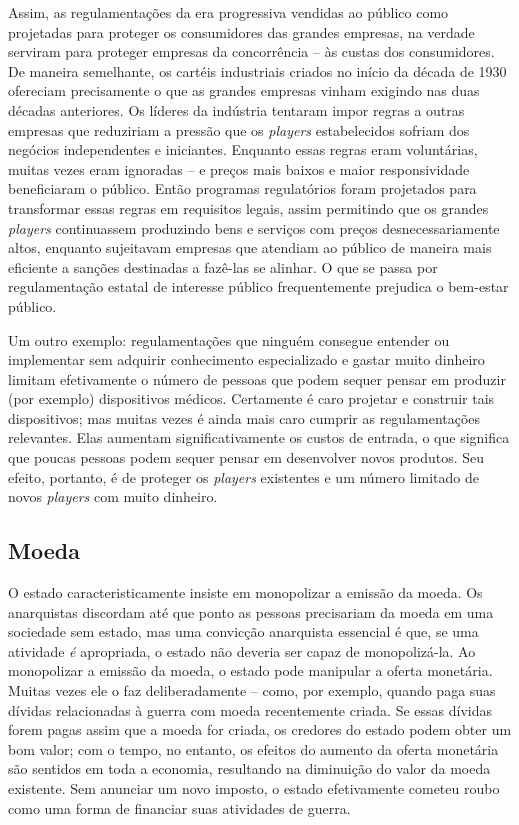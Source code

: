 Assim, as regulamentações da era progressiva vendidas ao público como projetadas para proteger os consumidores das grandes empresas, na verdade serviram para proteger empresas da concorrência -- às custas dos consumidores. De maneira semelhante, os cartéis industriais criados no início da década de 1930 ofereciam precisamente o que as grandes empresas vinham exigindo nas duas décadas anteriores. Os líderes da indústria tentaram impor regras a outras empresas que reduziriam a pressão que os \emph{players} estabelecidos sofriam dos negócios independentes e iniciantes. Enquanto essas regras eram voluntárias, muitas vezes eram ignoradas -- e preços mais baixos e maior responsividade beneficiaram o público. Então programas regulatórios foram projetados para transformar essas regras em requisitos legais, assim permitindo que os grandes \emph{players} continuassem produzindo bens e serviços com preços desnecessariamente altos, enquanto sujeitavam empresas que atendiam ao público de maneira mais eficiente a sanções destinadas a fazê-las se alinhar. O que se passa por regulamentação estatal de interesse público frequentemente prejudica o bem-estar público.

Um outro exemplo: regulamentações que ninguém consegue entender ou implementar sem adquirir conhecimento especializado e gastar muito dinheiro limitam efetivamente o número de pessoas que podem sequer pensar em produzir (por exemplo) dispositivos médicos. Certamente é caro projetar e construir tais dispositivos; mas muitas vezes é ainda mais caro cumprir as regulamentações relevantes. Elas aumentam significativamente os custos de entrada, o que significa que poucas pessoas podem sequer pensar em desenvolver novos produtos. Seu efeito, portanto, é de proteger os \emph{players} existentes e um número limitado de novos \emph{players} com muito dinheiro.

\subsection*{Moeda}

O estado caracteristicamente insiste em monopolizar a emissão da moeda. Os anarquistas discordam até que ponto as pessoas precisariam da moeda em uma sociedade sem estado, mas uma convicção anarquista essencial é que, se uma atividade \emph{é} apropriada, o estado não deveria ser capaz de monopolizá-la. Ao monopolizar a emissão da moeda, o estado pode manipular a oferta monetária. Muitas vezes ele o faz deliberadamente -- como, por exemplo, quando paga suas dívidas relacionadas à guerra com moeda recentemente criada. Se essas dívidas forem pagas assim que a moeda for criada, os credores do estado podem obter um bom valor; com o tempo, no entanto, os efeitos do aumento da oferta monetária são sentidos em toda a economia, resultando na diminuição do valor da moeda existente. Sem anunciar um novo imposto, o estado efetivamente cometeu roubo como uma forma de financiar suas atividades de guerra.

